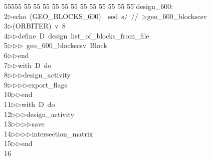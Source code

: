 %
%
\begin{tabbing}
55555 \= 55 \= 55 \= 55 \= 55 \= 55 \= 55 \= 55 \= 55 \= 55 \= 55 \= 55 \= 55 \= \>design\_600:\\[0pt]
2\>$\triangleright$\>echo\ (GEO\_BLOCKS\_600)\ {\textbar}\ sed\ s/\ //\ {\textgreater}geo\_600\_blockscsv\\[0pt]
3\>$\triangleright$\>(ORBITER)\ v\ 8\ \\[0pt]
4\>$\triangleright$\>$\triangleright$\>define\ D\ design\ list\_of\_blocks\_from\_file\ \\[0pt]
5\>$\triangleright$\>$\triangleright$\>$\triangleright$\ geo\_600\_blockscsv\ Block\ \\[0pt]
6\>$\triangleright$\>$\triangleright$\>end\ \\[0pt]
7\>$\triangleright$\>$\triangleright$\>with\ D\ do\ \\[0pt]
8\>$\triangleright$\>$\triangleright$\>$\triangleright$\>design\_activity\ \\[0pt]
9\>$\triangleright$\>$\triangleright$\>$\triangleright$\>$\triangleright$\>export\_flags\ \\[0pt]
10\>$\triangleright$\>$\triangleright$\>end\ \\[0pt]
11\>$\triangleright$\>$\triangleright$\>with\ D\ do\ \\[0pt]
12\>$\triangleright$\>$\triangleright$\>$\triangleright$\>design\_activity\ \\[0pt]
13\>$\triangleright$\>$\triangleright$\>$\triangleright$\>$\triangleright$\>save\ \\[0pt]
14\>$\triangleright$\>$\triangleright$\>$\triangleright$\>$\triangleright$\>intersection\_matrix\ \\[0pt]
15\>$\triangleright$\>$\triangleright$\>end\\[0pt]
16\>\end{tabbing}
